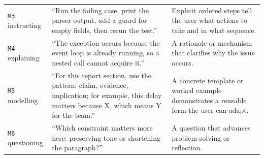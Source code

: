 \begin{table}[!htbp]
\begin{tabularx}{\textwidth}{>{\raggedright\arraybackslash}p{}>{\raggedright\arraybackslash}p{}X}
\addlinespace[2pt]
\texttt{M3} instructing & ``Run the failing case, print the parser output, add a guard for empty fields, then rerun the test.'' & Explicit ordered steps tell the user what actions to take and in what sequence. \\
\addlinespace[2pt]
\texttt{M4} explaining & ``The exception occurs because the event loop is already running, so a nested call cannot acquire it.'' & A rationale or mechanism that clarifies why the issue occurs. \\
\addlinespace[2pt]
\texttt{M5} modelling & ``For this report section, use the pattern: claim, evidence, implication; for example, this delay matters because X, which means Y for the team.'' & A concrete template or worked example demonstrates a reusable form the user can adapt. \\
\addlinespace[2pt]
\texttt{M6} questioning & ``Which constraint matters more here: preserving tone or shortening the paragraph?'' & A question that advances problem solving or reflection. \\
\bottomrule
\end{tabularx}
\end{table}
